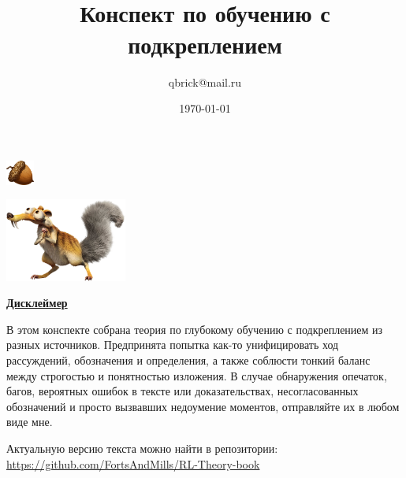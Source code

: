 \documentclass[a4paper, 10pt, oneside]{memoir}
\title{
\vspace{4cm}
\normalfont \normalsize 
\horrule{0.5pt} \\[0.4cm]
\huge Конспект по обучению с подкреплением
\horrule{2pt} \\[0.5cm]
}
\author{qbrick@mail.ru}
\date{\normalsize\today}
\begin{document}

\maketitle
\thispagestyle{empty}

\vspace{-6.3cm}
\begin{adjustwidth}{0.5cm}{}
    \includegraphics[width=0.07\textwidth]{Images/nut_cartoon.png}
\end{adjustwidth}
\vspace{4cm}
\begin{center}
    \includegraphics[width=0.3\textwidth]{Images/Scrat_iceage.png}
\end{center}

\vspace{2.2cm}
\begin{center}
\textcolor{ChadBlue}{\underline{\textbf{Дисклеймер}}}
\end{center}

\vspace{0.75cm}
В этом конспекте собрана теория по глубокому обучению с подкреплением из разных источников. Предпринята попытка как-то унифицировать ход рассуждений, обозначения и определения, а также соблюсти тонкий баланс между строгостью и понятностью изложения. В случае обнаружения опечаток, багов, вероятных ошибок в тексте или доказательствах, несогласованных обозначений и просто вызвавших недоумение моментов, отправляйте их в любом виде мне.

\vspace{0.25cm}
\begin{center}
Актуальную версию текста можно найти в репозитории: \\ \href{https://github.com/FortsAndMills/RL-Theory-book}{https://github.com/FortsAndMills/RL-Theory-book}
\end{center}
\end{document}
